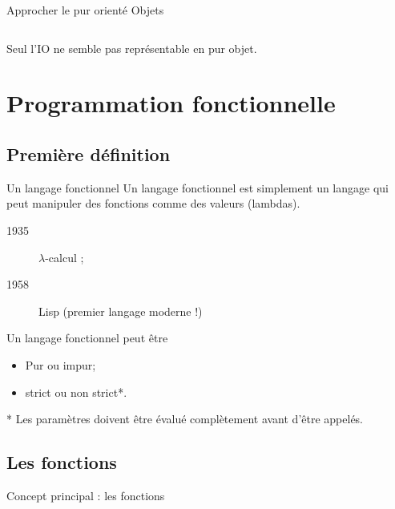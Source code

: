 \documentclass{beamer}
\newcommand{\adjustimg}{%
  \checkoddpage%
  \ifoddpage\hspace*{
		\dimexpr\evensidemargin-\oddsidemargin}\else\hspace*{
			-\dimexpr\evensidemargin-\oddsidemargin}\fi%
}
\newcommand{\centerimg}[2][width=\textwidth]{%
  \makebox[\textwidth]{\adjustimg\texttt{[image: \#2]}}%
}
\begin{document}
	\begin{frame}{Approcher le \og pur \fg orienté Objets}
		\begin{columns}[t]
			\begin{column}{5cm}
				
			\end{column}
			\begin{column}{5cm}
				
			\end{column}

		\end{columns}
		Seul l'\alert{IO} ne semble pas représentable en pur objet.
	\end{frame}

	\section{Programmation fonctionnelle}
	\subsection{Première définition}
	\begin{frame}{Un langage fonctionnel}
    Un langage fonctionnel est \alert{simplement} un langage qui peut
    manipuler des fonctions comme des valeurs (lambdas).
    \begin{description}
      \item[1935] $\lambda$-calcul ;
      \item[1958] Lisp (premier langage moderne !)
    \end{description}
    Un langage fonctionnel peut être
    \begin{itemize}
      \item Pur ou impur;
      \item strict ou non strict*.
    \end{itemize}
    * Les paramètres doivent être évalué complètement avant d'être appelés.
	\end{frame}

  \subsection{Les fonctions}
  \begin{frame}{Concept principal : les fonctions}

    \centerimg[width=300pt, height=100pt]{figures/function.pdf}

  \end{frame}
\end{document}
